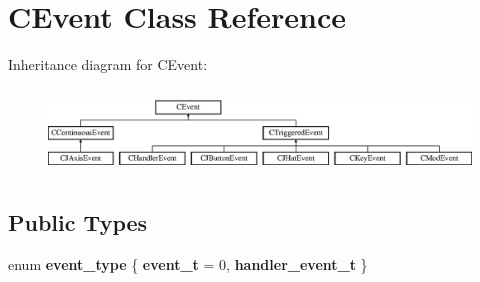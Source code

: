 \hypertarget{classCEvent}{\section{C\-Event Class Reference}
\label{classCEvent}
}
Inheritance diagram for C\-Event\-:\begin{figure}[H]
\begin{center}
\leavevmode
\includegraphics[height=2.258065cm]{classCEvent}
\end{center}
\end{figure}
\subsection*{Public Types}
\begin{DoxyCompactItemize}
\item 
enum {\bfseries event\-\_\-type} \{ {\bfseries event\-\_\-t} = 0, 
{\bfseries handler\-\_\-event\-\_\-t}
 \}
\end{DoxyCompactItemize}
